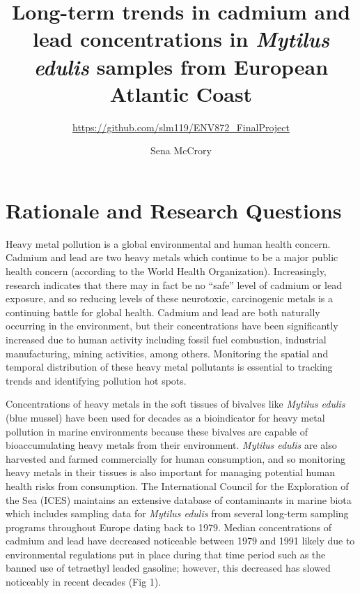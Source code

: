 \documentclass[
  12pt,
]{article}
\title{Long-term trends in cadmium and lead concentrations in \emph{Mytilus
edulis} samples from European Atlantic Coast}
\subtitle{\url{https://github.com/slm119/ENV872_FinalProject}}
\author{Sena McCrory}
\date{}
\begin{document}
\maketitle

\newpage
\tableofcontents 
\newpage
\listoftables 
\newpage
\listoffigures 
\newpage

\hypertarget{rationale-and-research-questions}{%
\section{Rationale and Research
Questions}\label{rationale-and-research-questions}}

Heavy metal pollution is a global environmental and human health
concern. Cadmium and lead are two heavy metals which continue to be a
major public health concern (according to the World Health
Organization). Increasingly, research indicates that there may in fact
be no ``safe'' level of cadmium or lead exposure, and so reducing levels
of these neurotoxic, carcinogenic metals is a continuing battle for
global health. Cadmium and lead are both naturally occurring in the
environment, but their concentrations have been significantly increased
due to human activity including fossil fuel combustion, industrial
manufacturing, mining activities, among others. Monitoring the spatial
and temporal distribution of these heavy metal pollutants is essential
to tracking trends and identifying pollution hot spots.

Concentrations of heavy metals in the soft tissues of bivalves like
\emph{Mytilus edulis} (blue mussel) have been used for decades as a
bioindicator for heavy metal pollution in marine environments because
these bivalves are capable of bioaccumulating heavy metals from their
environment. \emph{Mytilus edulis} are also harvested and farmed
commercially for human consumption, and so monitoring heavy metals in
their tissues is also important for managing potential human health
risks from consumption. The International Council for the Exploration of
the Sea (ICES) maintains an extensive database of contaminants in marine
biota which includes sampling data for \emph{Mytilus edulis} from
several long-term sampling programs throughout Europe dating back to
1979. Median concentrations of cadmium and lead have decreased
noticeable between 1979 and 1991 likely due to environmental regulations
put in place during that time period such as the banned use of
tetraethyl leaded gasoline; however, this decreased has slowed
noticeably in recent decades (Fig 1).
\end{document}
